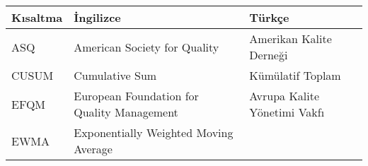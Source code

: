 \documentclass[
]{book}
\begin{document}
\begin{longtable}[]{@{}lll@{}}
\toprule
\begin{minipage}[b]{0.31\columnwidth}\raggedright
Kısaltma\strut
\end{minipage} & \begin{minipage}[b]{0.29\columnwidth}\raggedright
İngilizce\strut
\end{minipage} & \begin{minipage}[b]{0.31\columnwidth}\raggedright
Türkçe\strut
\end{minipage}\tabularnewline
\midrule
\endhead
\begin{minipage}[t]{0.31\columnwidth}\raggedright
ASQ\strut
\end{minipage} & \begin{minipage}[t]{0.29\columnwidth}\raggedright
American Society for Quality\strut
\end{minipage} & \begin{minipage}[t]{0.31\columnwidth}\raggedright
Amerikan Kalite Derneği\strut
\end{minipage}\tabularnewline
\begin{minipage}[t]{0.31\columnwidth}\raggedright
CUSUM\strut
\end{minipage} & \begin{minipage}[t]{0.29\columnwidth}\raggedright
Cumulative Sum\strut
\end{minipage} & \begin{minipage}[t]{0.31\columnwidth}\raggedright
Kümülatif Toplam\strut
\end{minipage}\tabularnewline
\begin{minipage}[t]{0.31\columnwidth}\raggedright
EFQM\strut
\end{minipage} & \begin{minipage}[t]{0.29\columnwidth}\raggedright
European Foundation for Quality Management\strut
\end{minipage} & \begin{minipage}[t]{0.31\columnwidth}\raggedright
Avrupa Kalite Yönetimi Vakfı\strut
\end{minipage}\tabularnewline
\begin{minipage}[t]{0.31\columnwidth}\raggedright
EWMA\strut
\end{minipage} & \begin{minipage}[t]{0.29\columnwidth}\raggedright
Exponentially Weighted Moving Average\strut
\end{minipage} & \begin{minipage}[t]{0.31\columnwidth}\raggedright

\end{minipage}
\end{longtable}
\end{document}
